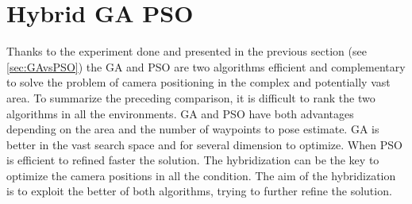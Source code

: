  







\section{Hybrid GA PSO }\label{sec:hybridGAPSO}
 

Thanks to the experiment done and presented in the previous section (see \ref{sec:GAvsPSO}) the GA and PSO are two algorithms efficient and complementary to solve the problem of camera positioning in the complex and potentially vast area.
  To summarize the preceding comparison, it is difficult to rank the two algorithms in all the environments. GA and PSO have both advantages depending on the area and the number of waypoints to pose estimate. GA is better in the vast search space and for several dimension to optimize. When PSO is efficient to refined faster the solution.
 The hybridization can be the key to optimize the camera positions in all the condition. The aim of the hybridization is to exploit the better of both algorithms, trying to further refine the solution. 

